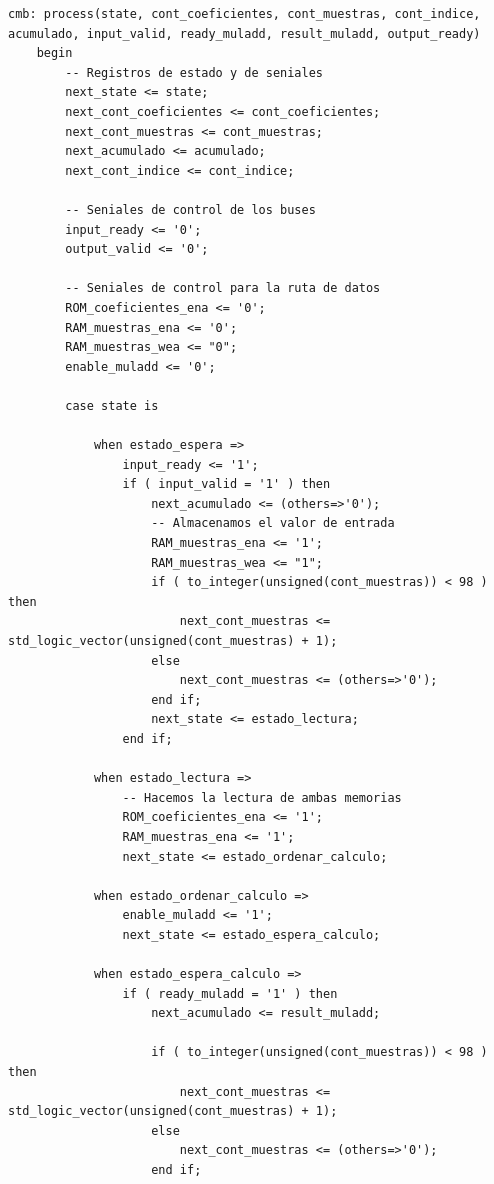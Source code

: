 \lstset{language=VHDL, breaklines=true, basicstyle=\footnotesize}
\begin{lstlisting}[frame=single]
    cmb: process(state, cont_coeficientes, cont_muestras, cont_indice, acumulado, input_valid, ready_muladd, result_muladd, output_ready)
    begin
        -- Registros de estado y de seniales
        next_state <= state;
        next_cont_coeficientes <= cont_coeficientes;
        next_cont_muestras <= cont_muestras;
        next_acumulado <= acumulado;
        next_cont_indice <= cont_indice;
        
        -- Seniales de control de los buses
        input_ready <= '0';
        output_valid <= '0';
        
        -- Seniales de control para la ruta de datos
        ROM_coeficientes_ena <= '0';
        RAM_muestras_ena <= '0';
        RAM_muestras_wea <= "0";
        enable_muladd <= '0';
  
        case state is 
            
            when estado_espera =>
                input_ready <= '1';
                if ( input_valid = '1' ) then
                    next_acumulado <= (others=>'0');
                    -- Almacenamos el valor de entrada
                    RAM_muestras_ena <= '1';
                    RAM_muestras_wea <= "1";
                    if ( to_integer(unsigned(cont_muestras)) < 98 ) then
                        next_cont_muestras <= std_logic_vector(unsigned(cont_muestras) + 1);                        
                    else
                        next_cont_muestras <= (others=>'0');
                    end if;
                    next_state <= estado_lectura;
                end if;
                 
            when estado_lectura => 
                -- Hacemos la lectura de ambas memorias  
                ROM_coeficientes_ena <= '1';
                RAM_muestras_ena <= '1';
                next_state <= estado_ordenar_calculo;
                
            when estado_ordenar_calculo =>
                enable_muladd <= '1';
                next_state <= estado_espera_calculo;
                            
            when estado_espera_calculo =>
                if ( ready_muladd = '1' ) then
                    next_acumulado <= result_muladd;
                    
                    if ( to_integer(unsigned(cont_muestras)) < 98 ) then
                        next_cont_muestras <= std_logic_vector(unsigned(cont_muestras) + 1);                        
                    else
                        next_cont_muestras <= (others=>'0');
                    end if;
                    

\end{lstlisting}
